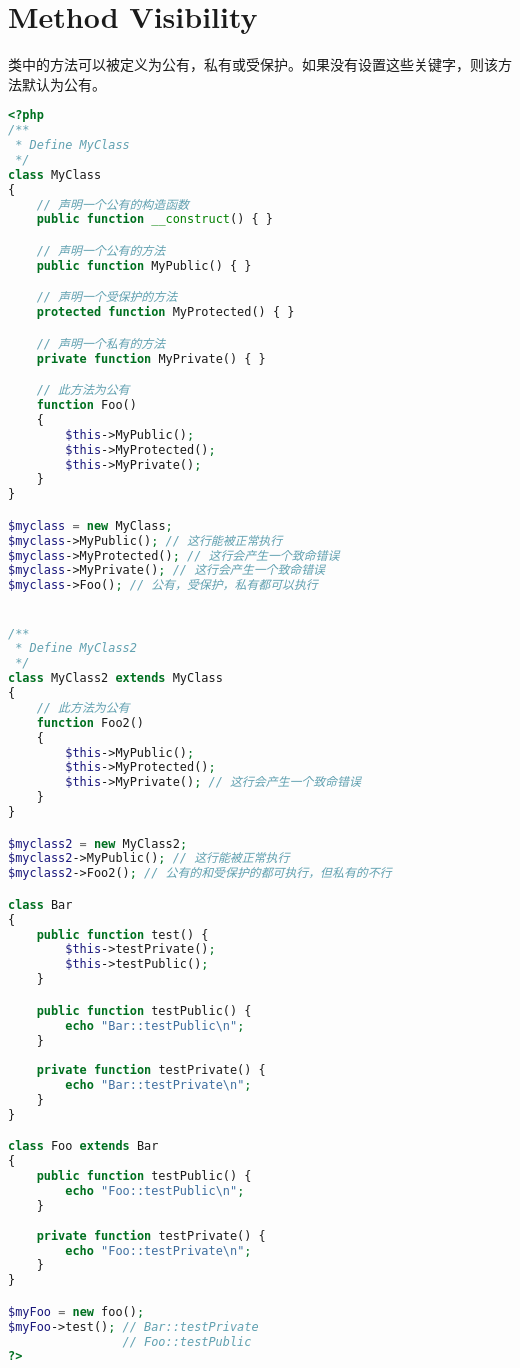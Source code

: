 \section{Method Visibility}

类中的方法可以被定义为公有，私有或受保护。如果没有设置这些关键字，则该方法默认为公有。


\begin{lstlisting}[language=PHP]
<?php
/**
 * Define MyClass
 */
class MyClass
{
    // 声明一个公有的构造函数
    public function __construct() { }

    // 声明一个公有的方法
    public function MyPublic() { }

    // 声明一个受保护的方法
    protected function MyProtected() { }

    // 声明一个私有的方法
    private function MyPrivate() { }

    // 此方法为公有
    function Foo()
    {
        $this->MyPublic();
        $this->MyProtected();
        $this->MyPrivate();
    }
}

$myclass = new MyClass;
$myclass->MyPublic(); // 这行能被正常执行
$myclass->MyProtected(); // 这行会产生一个致命错误
$myclass->MyPrivate(); // 这行会产生一个致命错误
$myclass->Foo(); // 公有，受保护，私有都可以执行


/**
 * Define MyClass2
 */
class MyClass2 extends MyClass
{
    // 此方法为公有
    function Foo2()
    {
        $this->MyPublic();
        $this->MyProtected();
        $this->MyPrivate(); // 这行会产生一个致命错误
    }
}

$myclass2 = new MyClass2;
$myclass2->MyPublic(); // 这行能被正常执行
$myclass2->Foo2(); // 公有的和受保护的都可执行，但私有的不行

class Bar 
{
    public function test() {
        $this->testPrivate();
        $this->testPublic();
    }

    public function testPublic() {
        echo "Bar::testPublic\n";
    }
    
    private function testPrivate() {
        echo "Bar::testPrivate\n";
    }
}

class Foo extends Bar 
{
    public function testPublic() {
        echo "Foo::testPublic\n";
    }
    
    private function testPrivate() {
        echo "Foo::testPrivate\n";
    }
}

$myFoo = new foo();
$myFoo->test(); // Bar::testPrivate 
                // Foo::testPublic
?>
\end{lstlisting}



